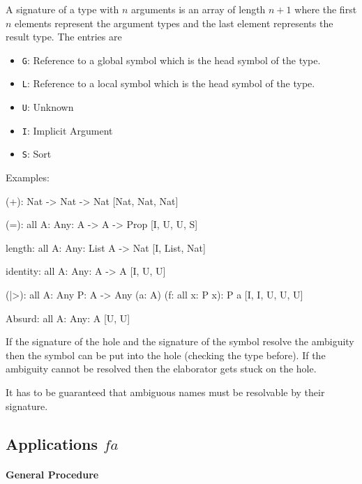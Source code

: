 A signature of a type with $n$ arguments is an array of length $n+1$ where the
first $n$ elements represent the argument types and the last element represents
the result type. The entries are
\begin{itemize}
    \item {\tt G}: Reference to a global symbol which is the head symbol of the
        type.
    \item {\tt L}: Reference to a local symbol which is the head symbol of the
        type.
    \item {\tt U}: Unknown
    \item {\tt I}: Implicit Argument
    \item {\tt S}: Sort
\end{itemize}
%
%
Examples:
\begin{alba}
    (+): Nat -> Nat -> Nat
            [Nat, Nat, Nat]

    (=): all {A: Any}: A -> A -> Prop
            [I, U, U, S]

    length: all {A: Any}: List A -> Nat
            [I, List, Nat]

    identity: all {A: Any}: A -> A
            [I, U, U]

    (|>): all {A: Any} {P: A -> Any} (a: A) (f: all x: P x): P a
            [I, I, U, U, U]

    Absurd: all {A: Any}: A
            [U, U]
\end{alba}
%
If the signature of the hole and the signature of the symbol resolve the
ambiguity then the symbol can be put into the hole (checking the type before).
If the ambiguity cannot be resolved then the elaborator gets stuck on the hole.

It has to be guaranteed that ambiguous names must be resolvable by their
signature.








\subsection{Applications $f a$}


\paragraph{General Procedure}


